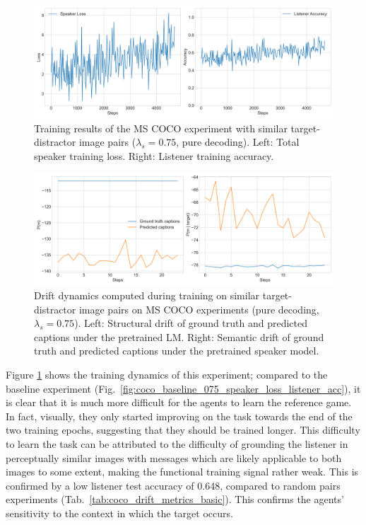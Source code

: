\begin{figure}[h]
	\centering
	\includegraphics[width=\linewidth]{images/coco_similarFixed_075_losses.png}
	\caption{Training results of the MS COCO experiment with similar target-distractor image pairs ($\lambda_s=0.75$, pure decoding). Left: Total speaker training loss. Right: Listener training accuracy.}
	\label{fig:coco_similar_speaker_loss_listener_acc_all}
\end{figure}

\begin{figure}[h]
	\centering
	\includegraphics[width=\linewidth]{images/coco_structural_semantic_drift_4000_pure_075_similarFixed.png}
	\caption{Drift dynamics computed during training on similar target-distractor image pairs on MS COCO experiments (pure decoding, $\lambda_s=0.75$). Left: Structural drift of ground truth and predicted captions under the pretrained LM. Right: Semantic drift of ground truth and predicted captions under the pretrained speaker model.}
	\label{fig:coco_similar_str_sem_drift_all}
\end{figure}

Figure \ref{fig:coco_similar_speaker_loss_listener_acc_all} shows the training dynamics of this experiment; compared to the baseline experiment (Fig.~\ref{fig:coco_baseline_075_speaker_loss_listener_acc}), it is clear that it is much more difficult for the agents to learn the reference game. In fact, visually, they only started improving on the task towards the end of the two training epochs, suggesting that they should be trained longer. This difficulty to learn the task can be attributed to the difficulty of grounding the listener in perceptually similar images with messages which are likely applicable to both images to some extent, making the functional training signal rather weak. This is confirmed by a low listener test accuracy of 0.648, compared to random pairs experiments (Tab.~\ref{tab:coco_drift_metrics_basic}). This confirms the agents' sensitivity to the context in which the target occurs. 

